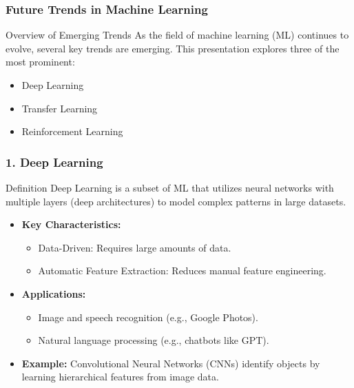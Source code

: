 \documentclass[aspectratio=169]{beamer}
\begin{document}
\begin{frame}[fragile]
    \frametitle{Future Trends in Machine Learning}
    \begin{block}{Overview of Emerging Trends}
        As the field of machine learning (ML) continues to evolve, several key trends are emerging. This presentation explores three of the most prominent: 
        \begin{itemize}
            \item Deep Learning
            \item Transfer Learning
            \item Reinforcement Learning
        \end{itemize}
    \end{block}
\end{frame}

\begin{frame}[fragile]
    \frametitle{1. Deep Learning}
    \begin{block}{Definition}
        Deep Learning is a subset of ML that utilizes neural networks with multiple layers (deep architectures) to model complex patterns in large datasets.
    \end{block}
    \begin{itemize}
        \item \textbf{Key Characteristics:}
        \begin{itemize}
            \item Data-Driven: Requires large amounts of data.
            \item Automatic Feature Extraction: Reduces manual feature engineering.
        \end{itemize}
        
        \item \textbf{Applications:}
        \begin{itemize}
            \item Image and speech recognition (e.g., Google Photos).
            \item Natural language processing (e.g., chatbots like GPT).
        \end{itemize}

        \item \textbf{Example:} 
        Convolutional Neural Networks (CNNs) identify objects by learning hierarchical features from image data.
    \end{itemize}
\end{frame}
\end{document}
